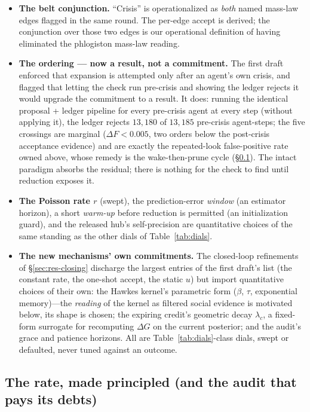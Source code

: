 \begin{itemize}
\item \textbf{The belt conjunction.} ``Crisis'' is operationalized as \emph{both} named
mass-law edges flagged in the same round. The per-edge accept is derived; the conjunction over
those two edges is our operational definition of having eliminated the phlogiston mass-law
reading.
\item \textbf{The ordering --- now a result, not a commitment.} The first draft enforced that
expansion is attempted only after an agent's own crisis, and flagged that letting the check run
pre-crisis and showing the ledger rejects it would upgrade the commitment to a result. It does:
running the identical proposal + ledger pipeline for every pre-crisis agent at every step
(without applying it), the ledger rejects $13{,}180$ of $13{,}185$ pre-crisis agent-steps; the
five crossings are marginal ($\Delta F < 0.005$, two orders below the post-crisis acceptance
evidence) and are exactly the repeated-look false-positive rate owned above, whose remedy is
the wake-then-prune cycle (\S\ref{app:exploration-future}). The intact paradigm absorbs the
residual; there is nothing for the check to find until reduction exposes it.
\item \textbf{The Poisson rate $r$} (swept), the prediction-error \emph{window} (an estimator
horizon), a short \emph{warm-up} before reduction is permitted (an initialization guard), and
the released hub's self-precision are quantitative choices of the same standing as the other
dials of Table~\ref{tab:dials}.
\item \textbf{The new mechanisms' own commitments.} The closed-loop refinements of
\S\ref{sec:res-closing} discharge the largest entries of the first draft's list (the constant
rate, the one-shot accept, the static $u$) but import quantitative choices of their own: the
Hawkes kernel's parametric form ($\beta$, $\tau$, exponential memory)---the \emph{reading} of
the kernel as filtered social evidence is motivated below, its shape is chosen; the expiring
credit's geometric decay $\lambda_c$, a fixed-form surrogate for recomputing $\Delta G$ on the
current posterior; and the audit's grace and patience horizons. All are
Table~\ref{tab:dials}-class dials, swept or defaulted, never tuned against an outcome.
\end{itemize}

\subsection{The rate, made principled (and the audit that pays its debts)}
\label{app:exploration-future}

